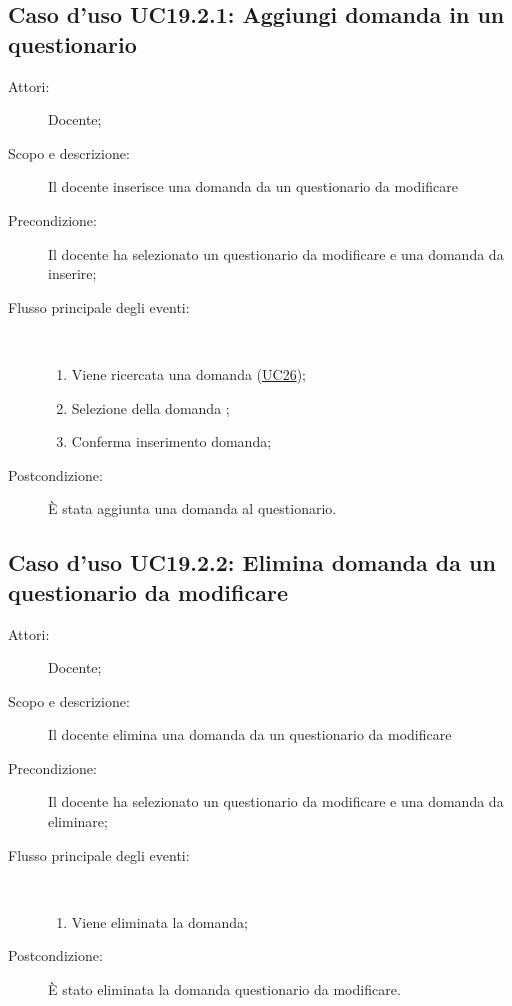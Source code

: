 \subsection{Caso d'uso UC19.2.1: Aggiungi domanda in un questionario}\begin{description}
\item[Attori:] Docente;
\item[Scopo e descrizione:] Il docente inserisce una domanda da un questionario da modificare
      \item[Precondizione:] Il docente ha selezionato un questionario da modificare e una domanda da inserire;

        \item[Flusso principale degli eventi:] \ 
 \begin{enumerate}
          \item Viene ricercata una domanda (\hyperlink{UC26}{UC26});
          \item Selezione della domanda	;
          \item Conferma inserimento domanda;

      \end{enumerate}
    \item[Postcondizione:] È stata aggiunta una domanda al questionario.
  \end{description}
\hypertarget{UC19.2.2}{}
\subsection{Caso d'uso UC19.2.2: Elimina domanda da un questionario da  modificare}\begin{description}
\item[Attori:] Docente;
\item[Scopo e descrizione:] Il docente elimina una domanda da un questionario da modificare
      \item[Precondizione:] Il docente ha selezionato un questionario da modificare e una domanda da eliminare;

        \item[Flusso principale degli eventi:] \ 
 \begin{enumerate}
          \item Viene eliminata la domanda;

      \end{enumerate}
    \item[Postcondizione:] È stato eliminata la domanda questionario da modificare.
  \end{description}
\hypertarget{UC19.2.3}{}
